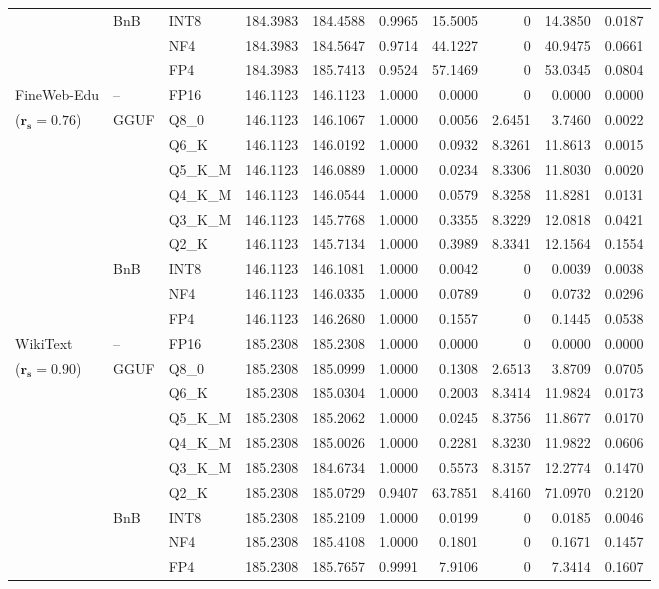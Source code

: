 \begin{longtable}{ll l rrrrrrr}
 & BnB & INT8 & 184.3983 & 184.4588 & 0.9965 & 15.5005 & \cellcolor{cyan!12} $0$ & 14.3850 & 0.0187 \\
 &  & NF4 & 184.3983 & 184.5647 & 0.9714 & 44.1227 & \cellcolor{cyan!12} $0$ & 40.9475 & 0.0661 \\
 &  & FP4 & 184.3983 & 185.7413 & 0.9524 & 57.1469 & \cellcolor{cyan!12} $0$ & 53.0345 & 0.0804 \\
\midrule
FineWeb-Edu & -- & FP16 & 146.1123 & 146.1123 & 1.0000 & 0.0000 & \cellcolor{cyan!12} $0$ & 0.0000 & 0.0000 \\
{\small ($\mathbf{r_s{=}0.76}$)} & GGUF & Q8\_0 & 146.1123 & 146.1067 & 1.0000 & 0.0056 & 2.6451 & 3.7460 & 0.0022 \\
 &  & Q6\_K & 146.1123 & 146.0192 & 1.0000 & 0.0932 & 8.3261 & 11.8613 & 0.0015 \\
 &  & Q5\_K\_M & 146.1123 & 146.0889 & 1.0000 & 0.0234 & 8.3306 & 11.8030 & 0.0020 \\
 &  & Q4\_K\_M & 146.1123 & 146.0544 & 1.0000 & 0.0579 & 8.3258 & 11.8281 & 0.0131 \\
 &  & Q3\_K\_M & 146.1123 & 145.7768 & 1.0000 & 0.3355 & 8.3229 & 12.0818 & 0.0421 \\
 &  & Q2\_K & 146.1123 & 145.7134 & 1.0000 & 0.3989 & 8.3341 & 12.1564 & 0.1554 \\
 & BnB & INT8 & 146.1123 & 146.1081 & 1.0000 & 0.0042 & \cellcolor{cyan!12} $0$ & 0.0039 & 0.0038 \\
 &  & NF4 & 146.1123 & 146.0335 & 1.0000 & 0.0789 & \cellcolor{cyan!12} $0$ & 0.0732 & 0.0296 \\
 &  & FP4 & 146.1123 & 146.2680 & 1.0000 & 0.1557 & \cellcolor{cyan!12} $0$ & 0.1445 & 0.0538 \\
\midrule
WikiText & -- & FP16 & 185.2308 & 185.2308 & 1.0000 & 0.0000 & \cellcolor{cyan!12} $0$ & 0.0000 & 0.0000 \\
{\small ($\mathbf{r_s{=}0.90}$)} & GGUF & Q8\_0 & 185.2308 & 185.0999 & 1.0000 & 0.1308 & 2.6513 & 3.8709 & 0.0705 \\
 &  & Q6\_K & 185.2308 & 185.0304 & 1.0000 & 0.2003 & 8.3414 & 11.9824 & 0.0173 \\
 &  & Q5\_K\_M & 185.2308 & 185.2062 & 1.0000 & 0.0245 & 8.3756 & 11.8677 & 0.0170 \\
 &  & Q4\_K\_M & 185.2308 & 185.0026 & 1.0000 & 0.2281 & 8.3230 & 11.9822 & 0.0606 \\
 &  & Q3\_K\_M & 185.2308 & 184.6734 & 1.0000 & 0.5573 & 8.3157 & 12.2774 & 0.1470 \\
 &  & Q2\_K & 185.2308 & 185.0729 & \cellcolor{red!18} 0.9407 & \cellcolor{red!18} 63.7851 & 8.4160 & \cellcolor{red!18} 71.0970 & \cellcolor{red!18} 0.2120 \\
 & BnB & INT8 & 185.2308 & 185.2109 & 1.0000 & 0.0199 & \cellcolor{cyan!12} $0$ & 0.0185 & 0.0046 \\
 &  & NF4 & 185.2308 & 185.4108 & 1.0000 & 0.1801 & \cellcolor{cyan!12} $0$ & 0.1671 & 0.1457 \\
 &  & FP4 & 185.2308 & 185.7657 & 0.9991 & 7.9106 & \cellcolor{cyan!12} $0$ & 7.3414 & 0.1607 \\
\end{longtable}
\endgroup